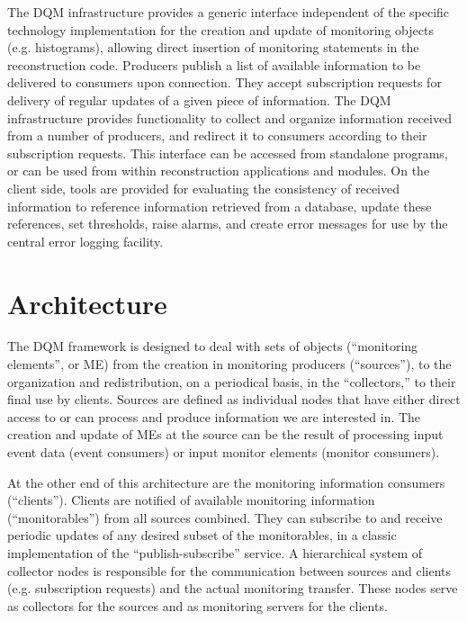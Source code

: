 \documentclass[a4paper]{cmspaper}
\newcommand{\pdfbookmark}[3][1]{}
\begin{document}
The DQM infrastructure provides a generic interface
independent of the specific technology implementation
for the  creation and update of monitoring objects (e.g. histograms),
allowing direct insertion of monitoring statements in the reconstruction code.
Producers publish a list of available information
to be delivered to consumers upon connection. They accept subscription
requests for delivery of regular updates of a given piece of information.
The DQM infrastructure provides functionality to collect and organize information received
from a number of producers, and redirect it to consumers according to their
subscription requests. This interface can be accessed from standalone
programs, or can be used from within reconstruction applications and
modules. On the client side, tools are provided for evaluating the
consistency of received information to reference information retrieved from
a database, update these references, set thresholds, raise alarms, and
create error messages for use by the central error logging facility.
%
%
\section{Architecture} \label{sec:architecture}
%
The DQM framework is designed to deal with sets of objects (``{monitoring
elements}'', or ME) from the creation in monitoring producers (``{sources}''),
to the organization and
redistribution, on a periodical basis, in the ``{collectors},'' to their final use
by {clients}. Sources are defined as
individual nodes that have either direct access to or can process and
produce information we are interested in. The creation and update of
MEs at the source can be the result of processing input event data
(event consumers) or input monitor elements (monitor consumers).

At the other end of this architecture are the monitoring information
consumers (``{clients}''). Clients are notified of available monitoring
information (``{monitorables}'') from all sources combined. They can
subscribe to and receive periodic updates of any desired subset of the
monitorables, in a classic implementation of the ``publish-subscribe'' service.
A hierarchical system of collector nodes is responsible for
the communication between sources and clients (e.g. subscription
requests) and the actual monitoring transfer. These nodes serve as
collectors for the sources and as monitoring servers for the clients.
\end{document}
